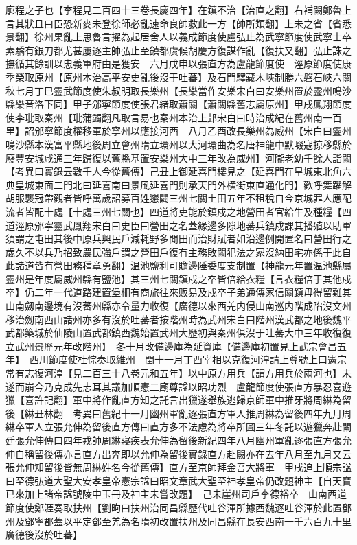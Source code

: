 廓程之子也【李程見二百四十三卷長慶四年】在鎮不治【治直之翻】右補闕鄭魯上言其狀且曰臣恐新麥未登徐師必亂速命良帥救此一方【帥所類翻】上未之省【省悉景翻】徐州果亂上思魯言擢為起居舍人以義成節度使盧弘止為武寧節度使武寧士卒素驕有銀刀都尤甚屢逐主帥弘止至鎮都虞候胡慶方復謀作亂【復扶又翻】弘止誅之撫循其餘訓以忠義軍府由是獲安　六月戊申以張直方為盧龍節度使　涇原節度使康季榮取原州【原州本治高平安史亂後沒于吐蕃】及石門驛藏木峽制勝六磐石峽六關秋七月丁巳靈武節度使朱叔明取長樂州【長樂當作安樂宋白曰安樂州置於靈州鳴沙縣樂音洛下同】甲子邠寧節度使張君緒取蕭關【蕭關縣舊志屬原州】甲戌鳳翔節度使李玭取秦州【玭蒲蠲翻凡取言易也秦州本治上邽宋白曰時治成紀在舊州南一百里】詔邠寧節度權移軍於寧州以應接河西　八月乙酉改長樂州為威州【宋白曰靈州鳴沙縣本漢富平縣地後周立會州隋立環州以大河環曲為名唐神龍中默啜寇掠移縣於廢豐安城咸通三年歸復以舊縣基置安樂州大中三年改為威州】河隴老幼千餘人詣闕　【考異曰實錄云數千人今從舊傳】己丑上御延喜門樓見之【延喜門在皇城東北角六典皇城東面二門北曰延喜南曰景風延喜門則承天門外横街東直通化門】歡呼舞躍解胡服襲冠帶觀者皆呼萬歲詔募百姓懇闢三州七關土田五年不租稅自今京城罪人應配流者皆配十處【十處三州七關也】四道將吏能於鎮戍之地營田者官給牛及種糧【四道涇原邠寜靈武鳳翔宋白曰史臣曰營田之名蓋緣邊多隙地蕃兵鎮戍課其播殖以助軍須謂之屯田其後中原兵興民戶減耗野多閒田而治財賦者如沿邊例開置名曰營田行之歲久不以兵乃招致農民強戶謂之營田戶復有主務敗闕犯法之家沒納田宅亦係于此自此諸道皆有營田務種章勇翻】温池鹽利可贍邊陲委度支制置【神龍元年置温池縣屬靈州是年度屬威州縣有鹽池】其三州七關鎮戍之卒皆倍給衣糧【言衣糧倍于其他戍卒】仍二年一代道路建置堡柵有商旅往來販易及戍卒子弟通傳家信關鎮毋得留難其山南劔南邊境有沒蕃州縣亦令量力收復【廣德以來西羌内侵山南巡内階成陷沒文州移治劒南西山諸州亦多有沒於吐蕃者按階州時為武州宋白曰階州漢武都之地後魏平武都築城於仙陵山置武都鎮西魏始置武州大歷初與秦州俱沒于吐蕃大中三年收復復立武州景歷元年改階州】　冬十月改備邊庫為延資庫【備邊庫初置見上武宗會昌五年】　西川節度使杜悰奏取維州　閏十一月丁酉宰相以克復河湟請上尊號上曰憲宗常有志復河湟【見二百三十八卷元和五年】以中原方用兵【謂方用兵於兩河也】未遂而崩今乃克成先志耳其議加順憲二廟尊諡以昭功烈　盧龍節度使張直方暴忍喜遊獵【喜許記翻】軍中將作亂直方知之託言出獵遂舉族逃歸京師軍中推牙將周綝為留後【綝丑林翻　考異曰舊紀十一月幽州軍亂逐張直方軍人推周綝為留後四年九月周綝卒軍人立張允伸為留後直方傳曰直方多不法慮為將卒所圖三年冬託以遊獵奔赴闕廷張允伸傳曰四年戎帥周綝寢疾表允伸為留後新紀四年八月幽州軍亂逐張直方張允伸自稱留後傳亦言直方出奔即以允伸為留後實錄直方赴闕亦在去年八月至九月又云張允伸知留後皆無周綝姓名今從舊傳】直方至京師拜金吾大將軍　甲戌追上順宗諡曰至德弘道大聖大安孝皇帝憲宗諡曰昭文章武大聖至神孝皇帝仍改題神主【自天寶已來加上諸帝諡號陵中玉冊及神主未嘗改題】　己未崖州司戶李德裕卒　山南西道節度使鄭涯奏取扶州【劉昫曰扶州治同昌縣歷代吐谷渾所據西魏逐吐谷渾於此置鄧州及鄧寧郡蓋以平定鄧至羌為名隋初改置扶州及同昌縣在長安西南一千六百九十里廣德後沒於吐蕃】

